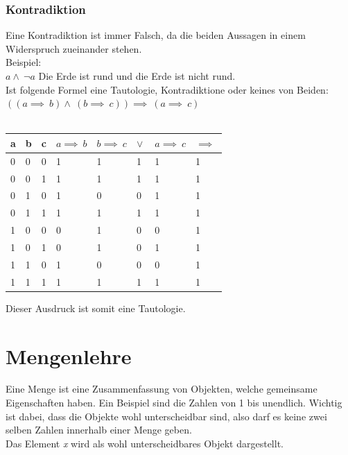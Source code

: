 \documentclass{article}
\begin{document}
	\subsubsection{Kontradiktion}
	Eine Kontradiktion ist immer Falsch, da die beiden Aussagen in einem Widerspruch zueinander stehen. \\
	Beispiel: \\
	$a \land\ \neg a$
	Die Erde ist rund und die Erde ist nicht rund. \\

	Ist folgende Formel eine Tautologie, Kontradiktione oder keines von Beiden: \\
	$((a \implies\ b) \land\ (b \implies\ c)) \implies\ (a \implies\ c)$ \\ \\
	\begin{tabular}{| l | l | l | l | l | l | l | l |}
		\toprule
		a & b & c & $a \implies\ b$ & $ b \implies\ c $ & $\lor\ $ & $a \implies\ c$ & $\implies\ $ \\ \midrule
		0 & 0 & 0 & 1 & 1 & 1 & 1 & 1 \\ \hline
		0 & 0 & 1 & 1 & 1 & 1 & 1 & 1 \\ \hline
		0 & 1 & 0 & 1 & 0 & 0 & 1 & 1 \\ \hline
		0 & 1 & 1 & 1 & 1 & 1 & 1 & 1 \\ \hline
		1 & 0 & 0 & 0 & 1 & 0 & 0 & 1 \\ \hline
		1 & 0 & 1 & 0 & 1 & 0 & 1 & 1 \\ \hline
		1 & 1 & 0 & 1 & 0 & 0 & 0 & 1 \\ \hline
		1 & 1 & 1 & 1 & 1 & 1 & 1 & 1 \\ 
		\bottomrule
	\end{tabular}
	Dieser Ausdruck ist somit eine Tautologie.
	\section{Mengenlehre}
	Eine Menge ist eine Zusammenfassung von Objekten, welche gemeinsame Eigenschaften haben. Ein Beispiel sind die Zahlen von 1 bis unendlich. Wichtig ist dabei, dass die Objekte wohl unterscheidbar sind, also darf es keine zwei selben Zahlen innerhalb einer Menge geben. \\
	Das Element \textit{x} wird als wohl unterscheidbares Objekt dargestellt.
\end{document}
